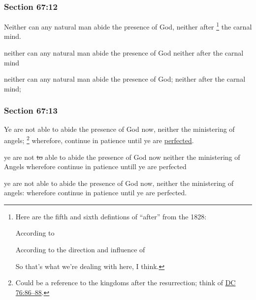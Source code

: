 	\subsubsection{Section 67:12} %
		\label{DC67-12}

		Neither can any natural man abide the presence of God, neither after%
			\footnote{%
				Here are the fifth and sixth defintions of ``after'' from the 1828:
					\begin{compactitem}
						\item[5] According to
						\item[6] According to the direction and influence of
					\end{compactitem}
				So that's what we're dealing with here, I think.
				}
		the carnal mind.

		\begin{framed}
		\scriptsize
			\begin{compactdesc}
				\item[JSP] neither can any natural man abide the presence of God neither after the carnal mind
				\item[DC 1835] neither can any natural man abide the presence of God; neither after the carnal mind;
			\end{compactdesc}
		\end{framed}

	\subsubsection{Section 67:13} %
		\label{DC67-13}

		Ye are not able to abide the presence of God now, neither the ministering of angels;%
			\footnote{%
				Could be a reference to the kingdoms after the resurrection; think of \hyperref[DC76-86]{DC 76:86--88}.
				}
		wherefore, continue in patience until ye are \hyperref[PERFECTION]{perfected}.

		\begin{framed}
		\scriptsize
			\begin{compactdesc}
				\item[JSP] ye are not \sout{to} able to abide the presence of God now neither the ministering of Angels wherefore continue in patience untill ye are perfected
				\item[DC 1835] ye are not able to abide the presence of God now, neither the ministering of angels: wherefore continue in patience until ye are perfected.
			\end{compactdesc}
		\end{framed}

